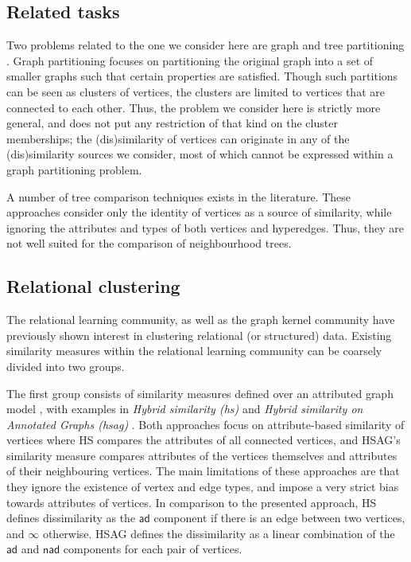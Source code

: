 \subsection{Related tasks}

Two problems related to the one we consider here are graph and tree partitioning \cite{bader2012dimacs}.
Graph partitioning focuses on partitioning the original graph into a set of smaller graphs such that certain properties are satisfied. 
Though such partitions can be seen as clusters of vertices, the clusters are limited to vertices that are connected to each other.
Thus, the problem we consider here is strictly more general, and does not put any restriction of that kind on the cluster memberships; the (dis)similarity of vertices can originate in any of the (dis)similarity sources we consider, most of which cannot be expressed within a graph partitioning problem.



A number of tree comparison techniques \cite{Bille:2005} exists in the literature.
These approaches consider only the identity of vertices as a source of similarity, while ignoring the attributes and types of both vertices and hyperedges.
Thus, they are not well suited for the comparison of neighbourhood trees.

\subsection{Relational clustering}
\label{sec:RelClust}

The relational learning community, as well as the graph kernel community have previously shown interest in clustering relational (or structured) data.
Existing similarity measures within the relational learning community can be coarsely divided into two groups.


The first group consists of similarity measures defined over an attributed graph model \cite{Pfeiffer2014}, with examples in  \textit{Hybrid similarity (\gls{hs})} \cite{Neville03clusteringrelational} and \textit{Hybrid similarity on Annotated Graphs (\gls{hsag})} \cite{WitsenburgB11a}.
Both approaches focus on attribute-based similarity of vertices where HS compares the attributes of all connected vertices, and HSAG's similarity measure compares attributes of the vertices themselves and attributes of their neighbouring vertices.
The main limitations of these approaches are that they ignore the existence of vertex and edge types, and impose a very strict bias towards attributes of vertices. 
In comparison to the presented approach, HS defines dissimilarity as the $\mathsf{ad}$ component if there is an edge between two vertices, and $\infty$ otherwise. 
HSAG defines the dissimilarity as a linear combination of the $\mathsf{ad}$ and $\mathsf{nad}$ components for each pair of vertices.  




